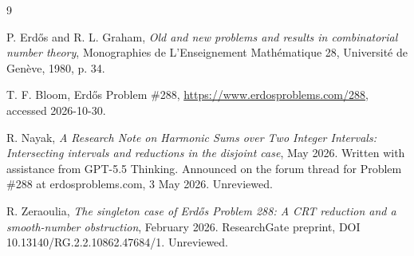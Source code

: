 \documentclass[11pt]{article}
\theoremstyle{remark}
\begin{document}
\begin{thebibliography}{9}

 P. Erd\H{o}s and R. L. Graham, \emph{Old and new problems and results in combinatorial number theory}, Monographies de L'Enseignement Math\'ematique 28, Universit\'e de Gen\`eve, 1980, p. 34.

 T. F. Bloom, Erd\H{o}s Problem \#288, \url{https://www.erdosproblems.com/288}, accessed 2026-10-30.

 R. Nayak, \emph{A Research Note on Harmonic Sums over Two Integer Intervals: Intersecting intervals and reductions in the disjoint case}, May 2026. Written with assistance from GPT-5.5 Thinking. Announced on the forum thread for Problem \#288 at erdosproblems.com, 3 May 2026. Unreviewed.

 R. Zeraoulia, \emph{The singleton case of Erd\H{o}s Problem 288: A CRT reduction and a smooth-number obstruction}, February 2026. ResearchGate preprint, DOI 10.13140/RG.2.2.10862.47684/1. Unreviewed.

\end{thebibliography}
\end{document}
